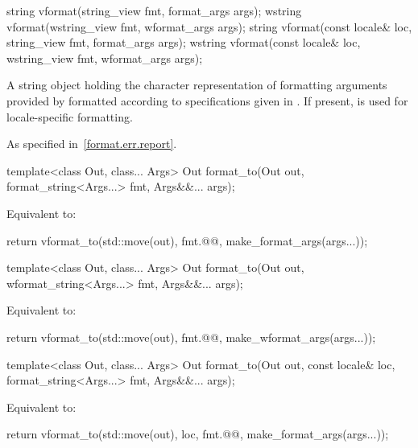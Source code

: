 %
\begin{itemdecl}
string vformat(string_view fmt, format_args args);
wstring vformat(wstring_view fmt, wformat_args args);
string vformat(const locale& loc, string_view fmt, format_args args);
wstring vformat(const locale& loc, wstring_view fmt, wformat_args args);
\end{itemdecl}

\begin{itemdescr}
\pnum
\returns
A string object holding the character representation of
formatting arguments provided by  formatted according to
specifications given in .
If present,  is used for locale-specific formatting.

\pnum
\throws
As specified in~\ref{format.err.report}.
\end{itemdescr}

%
\begin{itemdecl}
template<class Out, class... Args>
  Out format_to(Out out, format_string<Args...> fmt, Args&&... args);
\end{itemdecl}

\begin{itemdescr}
\pnum
\effects
Equivalent to:
\begin{codeblock}
return vformat_to(std::move(out), fmt.@@, make_format_args(args...));
\end{codeblock}
\end{itemdescr}

%
\begin{itemdecl}
template<class Out, class... Args>
  Out format_to(Out out, wformat_string<Args...> fmt, Args&&... args);
\end{itemdecl}

\begin{itemdescr}
\pnum
\effects
Equivalent to:
\begin{codeblock}
return vformat_to(std::move(out), fmt.@@, make_wformat_args(args...));
\end{codeblock}
\end{itemdescr}

%
\begin{itemdecl}
template<class Out, class... Args>
  Out format_to(Out out, const locale& loc, format_string<Args...>  fmt, Args&&... args);
\end{itemdecl}

\begin{itemdescr}
\pnum
\effects
Equivalent to:
\begin{codeblock}
return vformat_to(std::move(out), loc, fmt.@@, make_format_args(args...));
\end{codeblock}
\end{itemdescr}

